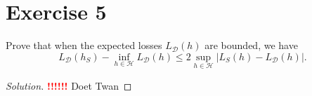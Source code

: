 \documentclass[10pt, a4paper, twoside]{amsart}
\newenvironment{solution}
               {\let\oldqedsymbol=\qedsymbol
                \renewcommand{\qedsymbol}{$\blacktriangleleft$}
                \begin{proof}[Solution]}
               {\end{proof}
                \renewcommand{\qedsymbol}{\oldqedsymbol}}
\newcommand{\TODO}{\textcolor{red}{\textbf{!!!!!! }}}
\begin{document}
\section*{Exercise 5}
Prove that when the expected losses $L_{\mathcal{D}}(h)$ are bounded, we have
\begin{equation*}
  L_{\mathcal{D}}(h_S) - \inf_{h\in \mathcal{H}}L_{\mathcal{D}}(h)
  \leq 2 \sup_{h\in \mathcal{H}}|L_S(h)-L_{\mathcal{D}}(h)|.
\end{equation*}
\begin{solution}
    \TODO Doet Twan
\end{solution}
\end{document}
